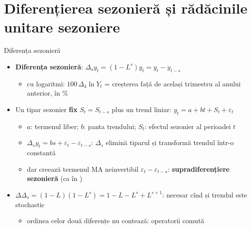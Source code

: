 \section{Diferențierea sezonieră și rădăcinile unitare sezoniere}

\begin{frame}{Diferența sezonieră}
\itemsize{\small}
\begin{itemize}
    \item \textbf{Diferența sezonieră}: $\Delta_s y_t = (1 - L^s)y_t = y_t - y_{t-s}$
    \begin{itemize}
        \item cu logaritmi: $100\,\Delta_4\ln Y_t$ = creșterea față de același trimestru al anului anterior, în \%
    \end{itemize}
    \item Un tipar sezonier \textbf{fix} $S_t = S_{t-s}$ plus un trend liniar: $y_t = a + bt + S_t + \varepsilon_t$
    \begin{itemize}
        \item $a$: termenul liber; $b$: panta trendului; $S_t$: efectul sezonier al perioadei $t$
        \item $\Delta_s y_t = bs + \varepsilon_t - \varepsilon_{t-s}$: $\Delta_s$ elimină tiparul și transformă trendul într-o constantă
        \item dar creează termenul MA neinvertibil $\varepsilon_t - \varepsilon_{t-s}$: \textbf{supradiferențiere sezonieră} (ca în )
    \end{itemize}
    \item $\Delta\Delta_s = (1 - L)(1 - L^s) = 1 - L - L^s + L^{s+1}$: necesar cînd și trendul este stochastic
    \begin{itemize}
        \item ordinea celor două diferențe nu contează: operatorii comută
    \end{itemize}
\end{itemize}
\end{frame}

